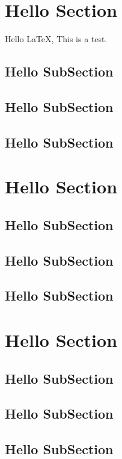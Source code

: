 \clearpage

\section{Hello Section}
Hello \LaTeX{}, This is a test.

\subsection{Hello SubSection}
\lipsum[3-5]
\subsection{Hello SubSection}
\lipsum[3-5]
\subsection{Hello SubSection}
\lipsum[3-5]

\section{Hello Section}
\lipsum[3-5]
\subsection{Hello SubSection}
\lipsum[3-5]
\subsection{Hello SubSection}
\lipsum[3-5]
\subsection{Hello SubSection}
\lipsum[3-5]

\section{Hello Section}
\lipsum[3-5]
\subsection{Hello SubSection}
\lipsum[3-5]
\subsection{Hello SubSection}
\lipsum[3-5]
\subsection{Hello SubSection}
\lipsum[3-5]

